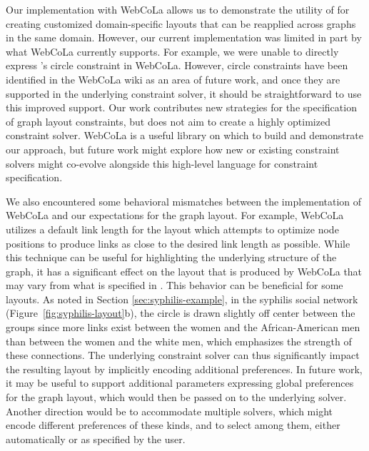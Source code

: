 

Our implementation with WebCoLa allows us to demonstrate the utility of
\projectname for creating customized domain-specific layouts that can be
reapplied across graphs in the same domain. However, our current
implementation was limited in part by what WebCoLa currently supports. For
example, we were unable to directly express \projectname's circle constraint in
WebCoLa.  However, circle constraints have been identified in the WebCoLa
wiki as an area of future work, and once they are supported in the
underlying constraint solver, it should be straightforward to use
this improved support. Our work contributes new strategies for the
specification of graph layout constraints, but does not aim to create a
highly optimized constraint solver. WebCoLa is a useful
library on which to build and demonstrate our approach, but 
future work might explore how new or existing constraint solvers might
co-evolve alongside this high-level language for constraint specification.

We also encountered some behavioral mismatches between the implementation
of WebCoLa and our expectations for the graph layout. For example, WebCoLa
utilizes a default link length for the layout which attempts to optimize
node positions to produce links as close to the desired link length as
possible. While this technique can be useful for highlighting the underlying 
structure of the graph, it has a significant effect on the layout that is
produced by WebCoLa that may vary from what is specified in \projectname.
This behavior can be beneficial for some layouts.
As noted in Section \ref{sec:syphilis-example}, in the syphilis social network
(Figure~\ref{fig:syphilis-layout}b), the circle is drawn slightly off
center between the groups since more links exist between the
women and the African-American men than between the women and
the white men, which emphasizes the strength of these connections.
The underlying constraint solver can thus
significantly impact the resulting layout by implicitly encoding
additional preferences. In future work, it may be useful to support
additional parameters expressing global preferences for the graph layout,
which would then be passed on to the underlying solver. Another direction
would be to accommodate multiple solvers, which might encode different
preferences of these kinds, and to select among them, either automatically
or as specified by the user.

